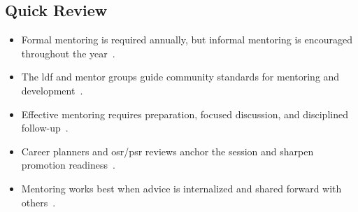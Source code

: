 \documentclass[../main.tex]{subfiles}
\begin{document}
\subsection{Quick Review}
\begin{itemize}
  \item Formal mentoring is required annually, but informal mentoring is encouraged throughout the year~\autocite{edo-5-2-6-mentoring-tips-2025}.
  \item The \ac{ldf} and mentor groups guide community standards for mentoring and development~\autocite{edo-5-2-6-mentoring-tips-2025}.
  \item Effective mentoring requires preparation, focused discussion, and disciplined follow-up~\autocite{edo-5-2-6-mentoring-tips-2025}.
  \item Career planners and \ac{osr}/\ac{psr} reviews anchor the session and sharpen promotion readiness~\autocite{edo-5-2-6-mentoring-tips-2025}.
  \item Mentoring works best when advice is internalized and shared forward with others~\autocite{edo-5-2-6-mentoring-tips-2025}.
\end{itemize}

\end{document}
